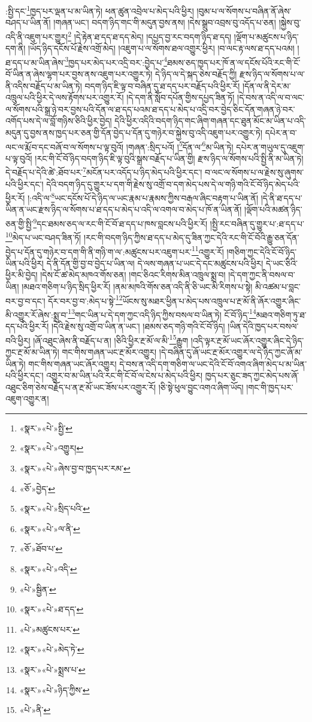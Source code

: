 :སྤྱི་དང་\footnote{«སྣར་»«པེ་»སྤྱི་}ཁྱད་པར་ལྡན་པ་མ་ཡིན་ཏེ། ཕན་ཚུན་འབྲེལ་པ་མེད་པའི་ཕྱིར། །བུམ་པ་ལ་སོགས་པ་བཞིན་ནོ་ཞེས་བཤད་པ་ཡིན་ནོ། །གཞན་ཡང་། བདག་ཉིད་གང་གི་མདུན་བྱས་ནས། །དེས་སྒྲུབ་འབྲས་བུ་འདོད་པ་ཅན། །སྐྱེས་བུ་འདི་ནི་འཇུག་པར་གྱུར།\footnote{«སྣར་»«པེ་»འགྱུར།} །དེ་རྟེན་ཐ་དད་ཐ་དད་མེད། །དཔྱད་བྱ་རང་བདག་ཉིད་ཐ་དད། །ལྡོག་པ་མཚུངས་པ་ཉིད་དག་ནི། །ཡོད་ཉིད་དངོས་པོ་རྗེས་འགྲོ་མེད། །འཇུག་པ་ལ་སོགས་ཐལ་འགྱུར་ཕྱིར། །བ་ལང་རྟ་ལས་ཐ་དད་པའམ། །
ཐ་དད་པ་མ་ཡིན་ཞེས་\footnote{«སྣར་»«པེ་»ཞེས་བྱ་བ་ཁྱད་པར་རམ་}ཁྱད་པར་མེད་པར་འདྲི་བར་:བྱེད་པ་\footnote{«ཅོ་»བྱེད་}ཐམས་ཅད་ཁྱད་པར་ཁོ་ན་ལ་དངོས་པོའི་རང་གི་ངོ་བོ་ཡིན་ན་ཞེས་ལྷག་པར་བྱས་ནས་འཇུག་པར་འགྱུར་ཏེ། དེ་ཉིད་ལ་དེ་སྐད་ཅེས་བརྗོད་ཀྱི། རྫས་ཉིད་ལ་སོགས་པ་ལ་ནི་འདིས་བརྗོད་པ་མ་ཡིན་ཏེ། བདག་ཉིད་ཇི་ལྟ་བ་བཞིན་དུ་ཐ་དད་པར་བརྗོད་པའི་ཕྱིར་རོ། །དོན་ལ་ནི་དེར་མ་འཁྲུལ་པའི་ཕྱིར་དེ་ལས་རྟོགས་པར་འགྱུར་རོ། །དེ་དག་ནི་སློབ་དཔོན་གྱིས་དཔྱད་ཟིན་ཏོ། །དེ་བས་ན་འདི་ལ་བ་ལང་ལ་སོགས་པའི་སྒྲ་ཉེ་བར་བྱས་པའི་དོན་ལ་ཐ་དད་པའམ་ཐ་དད་པ་མེད་པ་འདྲི་བར་བྱེད་ཅིང་དོན་གཞན་ཉེ་བར་འགོད་པས་དེ་ལ་བློ་གཉིས་ཅིའི་ཕྱིར་བྱེད། དེའི་ཕྱིར་འདིའི་བདག་ཉིད་གང་ཞིག་གཞན་དང་ཐུན་མོང་མ་ཡིན་པ་འདི་མདུན་དུ་བྱས་ནས་ཁྱད་པར་ཅན་གྱི་དོན་བྱེད་པ་དོན་དུ་གཉེར་བ་སྐྱེས་བུ་འདི་འཇུག་པར་འགྱུར་ཏེ། དཔེར་ན་བ་ལང་ལ་རྨོ་བ་དང་བཞོ་བ་ལ་སོགས་པ་ལྟ་བུའོ། །གཞན་:སྲིད་པའོ། །\footnote{«སྣར་»«པེ་»སྲིད་པའི་}དོན་ལ་\footnote{«སྣར་»«པེ་»ལ་ནི་}མ་ཡིན་ཏེ། དཔེར་ན་གཡུལ་དུ་འཇུག་པ་ལྟ་བུའོ། །རང་གི་ངོ་བོ་ཉིད་བདག་ཉིད་ཇི་ལྟ་བུའི་སྒྲས་བརྗོད་པ་ཡིན་གྱི། རྫས་ཉིད་ལ་སོགས་པའི་སྤྱི་ནི་མ་ཡིན་ཏེ། དེ་བརྗོད་པ་དེའི་ཚེ་:ཐོབ་པར་\footnote{«ཅོ་»ཐོབ་པ་}མངོན་པར་འདོད་པ་ཉིད་མེད་པའི་ཕྱིར་དང་། བ་ལང་ལ་སོགས་པ་ལ་རྗེས་སུ་ཞུགས་པའི་ཕྱིར་དང་། དེའི་བདག་ཉིད་དུ་གྱུར་པ་དག་གི་རྗེས་སུ་འགྲོ་བ་དག་མེད་པས་དེ་ལ་གཉི་གའི་ངོ་བོ་ཉིད་མེད་པའི་ཕྱིར་རོ། །:འདི་ལ་\footnote{«སྣར་»«པེ་»འདི་}ཡང་དངོས་པོ་དེ་ཉིད་ལ་ཡང་རྣམ་པ་རྣམས་ཀྱིས་བརྒལ་ཞིང་བརྟག་པ་ཡིན་ནོ། །དེ་ནི་ཐ་དད་པ་ཡིན་ན་ཡང་རྫས་ཉིད་ལ་སོགས་པ་ཐ་དད་པ་མེད་པ་འདི་ལ་འགལ་བ་མེད་པ་ཁོ་ན་ཡིན་ནོ། །ལྡོག་པའི་མཚན་ཉིད་ཅན་གྱི་སྤྱི་\footnote{«པེ་»སྦྱིན་}དང་ཐམས་ཅད་ལ་རང་གི་ངོ་བོ་ཐ་དད་པ་ཁས་བླངས་པའི་ཕྱིར་རོ། །སྤྱི་རང་བཞིན་དུ་གྱུར་པ་:ཐ་དད་པ་\footnote{«སྣར་»«པེ་»ཐ་དད་}མེད་པ་ཡང་བཤད་ཟིན་ཏོ། །རང་གི་བདག་ཉིད་ཀྱིས་ཐ་དད་པ་མེད་དུ་ཟིན་ཀྱང་དེའི་རང་གི་ངོ་བོའི་རྒྱུ་ཅན་དོན་བྱེད་པ་དོན་དུ་གཉེར་བ་དག་གི་ནི་གཉི་ག་ལ་:མཚུངས་པར་འཇུག་པར་\footnote{«པེ་»མཚུངས་པར་}འགྱུར་རོ། །གཅིག་ཀྱང་དེའི་ངོ་བོ་ཉིད་ཡིན་པའི་ཕྱིར། དེ་ནི་དོན་གྱི་བྱ་བ་བྱེད་པ་ཡིན་ལ། དེ་ལས་གཞན་པ་ཡང་དེ་དང་མཚུངས་པའི་ཕྱིར། དེ་ཡང་ཅིའི་ཕྱིར་མི་བྱེད། །དེས་ངོ་ཚ་མེད་མཁའ་གོས་ཅན། །གང་ཅིའང་རིགས་མིན་འཁྲུལ་སྨྲ་བ། །དེ་དག་ཀྱང་ནི་བསལ་བ་ཡིན། །མཐའ་གཅིག་པ་ཉིད་སྲིད་ཕྱིར་རོ། །ནམ་མཁའི་གོས་ཅན་འདི་ནི་ཅི་ཡང་མི་རིགས་པ་སྟེ། མི་འཚམ་པ་བླང་བར་བྱ་བ་དང་། དོར་བར་བྱ་བ་:མེད་པ་སྟེ་\footnote{«སྣར་»«པེ་»མེད་ཏེ་}ཡོངས་སུ་མཐར་ཕྱིན་པ་མེད་པས་འཁྲུལ་པ་རྔ་མོ་ནི་ཞོར་འགྱུར་ཞིང་མི་འགྱུར་རོ་ཞེས་:སྨྲ་བ་\footnote{«སྣར་»«པེ་»སྨྲས་པ་}གང་ཡིན་པ་དེ་དག་ཀྱང་འདི་ཉིད་ཀྱིས་བསལ་བ་ཡིན་ཏེ། ངོ་བོ་ཉིད་\footnote{«སྣར་»«པེ་»ཉིད་ཀྱིས་}མཐའ་གཅིག་ཏུ་ཐ་དད་པའི་ཕྱིར་རོ། །དེའི་རྗེས་སུ་འགྲོ་བ་ཡིན་ན་ཡང་། །ཐམས་ཅད་གཉི་གའི་ངོ་བོ་ཉིད། །ཡིན་དེའི་ཁྱད་པར་བསལ་བའི་ཕྱིར། །ཞོ་འཐུང་ཞེས་ནི་བརྗོད་པ་ན། །ཅིའི་ཕྱིར་རྔ་མོ་ལ་མི་\footnote{«པེ་»ནི་}རྒྱུག །འདི་ལྟར་རྔ་མོ་ཡང་ཞོར་འགྱུར་ཞིང་དེ་ཉིད་ཀྱང་རྔ་མོ་མ་ཡིན་ཏེ། གང་གིས་གཞན་ཡང་རྔ་མོར་འགྱུར། །དེ་བཞིན་དུ་ཞོ་ཡང་རྔ་མོར་འགྱུར་ལ་དེ་ཉིད་ཀྱང་ཞོ་མ་ཡིན་ཏེ། གང་གིས་གཞན་ཡང་ཞོར་འགྱུར། དེ་བས་ན་འདི་དག་གཅིག་ལ་ཡང་དེའི་ངོ་བོ་འགའ་ཞིག་མེད་པ་མ་ཡིན་པའི་ཕྱིར་དང་། འགྱུར་བ་མ་ཡིན་པའི་རང་གི་ངོ་བོ་ལ་ངེས་པ་མེད་པའི་ཕྱིར། ཁྱད་པར་ཅུང་ཟད་ཀྱང་མེད་པས་ཞོ་འཐུང་ཅིག་ཅེས་བརྗོད་པ་ན་རྔ་མོ་ཡང་ཟོས་པར་འགྱུར་རོ། །ཅི་སྟེ་ཕུལ་བྱུང་འགའ་ཞིག་ཡོད། །གང་གི་ཁྱད་པར་འཇུག་འགྱུར་ན། 
